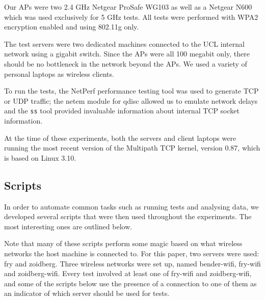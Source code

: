 Our APs were two 2.4 GHz Netgear ProSafe WG103 as well as a Netgear N600 which
was used exclusively for 5 GHz tests. All tests were performed with WPA2
encryption enabled and using 802.11g only.

The test servers were two dedicated machines connected to the UCL internal
network using a gigabit switch. Since the APs were all 100 megabit only, there
should be no bottleneck in the network beyond the APs. We used a variety of
personal laptops as wireless clients.

To run the tests, the NetPerf performance testing tool was used to generate TCP
or UDP traffic; the netem module for qdisc allowed us to emulate network delays
and the \texttt{ss} tool provided invaluable information about internal TCP
socket information.

At the time of these experiments, both the servers and client laptops were
running the most recent version of the Multipath TCP kernel, version 0.87, which
is based on Linux 3.10.

\subsection{Scripts}
\label{sec:met:scripts}
In order to automate common tasks such as running tests and analysing data, we
developed several scripts that were then used throughout the experiments. The
most interesting ones are outlined below.

Note that many of these scripts perform some magic based on what wireless
networks the host machine is connected to. For this paper, two servers were
used: fry and zoidberg. Three wireless networks were set up, named bender-wifi,
fry-wifi and zoidberg-wifi. Every test involved at least one of fry-wifi and
zoidberg-wifi, and some of the scripts below use the presence of a connection to
one of them as an indicator of which server should be used for tests.

